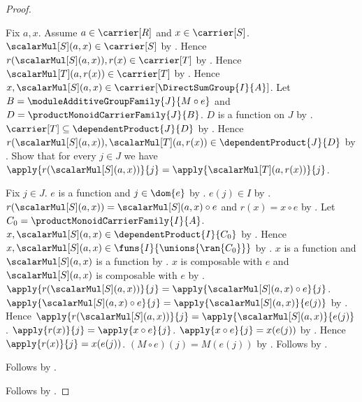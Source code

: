 \begin{proof}
    \begin{subproof}
        Fix $a,x$.
        Assume $a\in\carrier[R]$ and $x\in\carrier[S]$.
        $\scalarMul[S](a,x)\in\carrier[S]$ by
            .
        Hence $r(\scalarMul[S](a,x)),r(x)\in\carrier[T]$ by
            .
        Hence $\scalarMul[T](a,r(x))\in\carrier[T]$ by
            .
        Hence $x,\scalarMul[S](a,x)
            \in\carrier[\DirectSumGroup{I}{A}]$.
        Let $B=\moduleAdditiveGroupFamily{J}{M\circ e}$ and
            $D=\productMonoidCarrierFamily{J}{B}$.
        $D$ is a function on $J$ by
            .
        $\carrier[T]\subseteq\dependentProduct{J}{D}$ by
            .
        Hence $r(\scalarMul[S](a,x)),\scalarMul[T](a,r(x))
            \in\dependentProduct{J}{D}$ by .
        Show that for every $j\in J$ we have
            $\apply{r(\scalarMul[S](a,x))}{j}
                =\apply{\scalarMul[T](a,r(x))}{j}$.
        \begin{subproof}
            Fix $j\in J$.
            $e$ is a function and $j\in\dom{e}$ by
                .
            $e(j)\in I$ by .
            $r(\scalarMul[S](a,x))=\scalarMul[S](a,x)\circ e$ and
                $r(x)=x\circ e$ by
                .
            Let $C_0=\productMonoidCarrierFamily{I}{A}$.
            $x,\scalarMul[S](a,x)\in\dependentProduct{I}{C_0}$ by
                .
            Hence $x,\scalarMul[S](a,x)\in
                \funs{I}{\unions{\ran{C_0}}}$ by
                .
            $x$ is a function and $\scalarMul[S](a,x)$ is a function by
                .
            $x$ is composable with $e$ and
                $\scalarMul[S](a,x)$ is composable with $e$ by
                .
            $\apply{r(\scalarMul[S](a,x))}{j}
                =\apply{\scalarMul[S](a,x)\circ e}{j}$.
            $\apply{\scalarMul[S](a,x)\circ e}{j}
                =\apply{\scalarMul[S](a,x)}{e(j)}$ by
                .
            Hence $\apply{r(\scalarMul[S](a,x))}{j}
                =\apply{\scalarMul[S](a,x)}{e(j)}$.
            $\apply{r(x)}{j}=\apply{x\circ e}{j}$.
            $\apply{x\circ e}{j}=x(e(j))$ by .
            Hence $\apply{r(x)}{j}=x(e(j))$.
            $(M\circ e)(j)=M(e(j))$ by
                .
            Follows by .
        \end{subproof}
        Follows by .
    \end{subproof}
    Follows by .
\end{proof}

